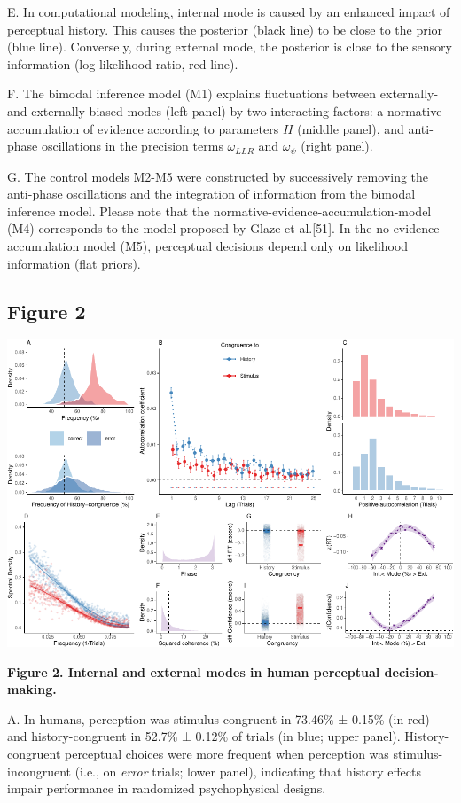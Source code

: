 \documentclass[
]{article}
\begin{document}
E. In computational modeling, internal mode is caused by an enhanced
impact of perceptual history. This causes the posterior (black line) to
be close to the prior (blue line). Conversely, during external mode, the
posterior is close to the sensory information (log likelihood ratio, red
line).

F. The bimodal inference model (M1) explains fluctuations between
externally- and externally-biased modes (left panel) by two interacting
factors: a normative accumulation of evidence according to parameters
\(H\) (middle panel), and anti-phase oscillations in the precision terms
\(\omega_{LLR}\) and \(\omega_{\psi}\) (right panel).

G. The control models M2-M5 were constructed by successively removing
the anti-phase oscillations and the integration of information from the
bimodal inference model. Please note that the
normative-evidence-accumulation-model (M4) corresponds to the model
proposed by Glaze et al.{[}51{]}. In the no-evidence-accumulation model
(M5), perceptual decisions depend only on likelihood information (flat
priors).

\newpage

\hypertarget{figure-2}{%
\subsection{Figure 2}\label{figure-2}}

\includegraphics{modes_mouse_rev2_files/figure-latex/Figure_2-1.pdf}

\textbf{Figure 2. Internal and external modes in human perceptual
decision-making.}

A. In humans, perception was stimulus-congruent in 73.46\% ± 0.15\% (in
red) and history-congruent in 52.7\% ± 0.12\% of trials (in blue; upper
panel). History-congruent perceptual choices were more frequent when
perception was stimulus-incongruent (i.e., on \emph{error} trials; lower
panel), indicating that history effects impair performance in randomized
psychophysical designs.
\end{document}
